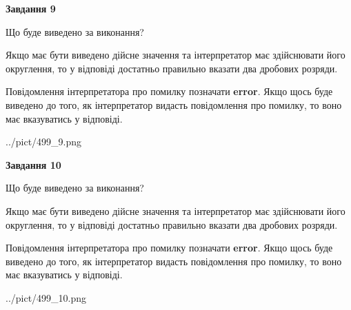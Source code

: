 \documentclass[12pt, ukrainian]{article}
\begin{document}
{\begin {Large}
{\begin {center}\textbf{Завдання 9}\end {center}}\par
Що буде виведено за виконання? \par

Якщо має бути виведено дійсне значення та інтерпретатор має здійснювати його округлення, 
то у відповіді достатньо правильно вказати два дробових розряди.

Повідомлення інтерпретатора про помилку позначати \textbf{error}.
Якщо щось буде виведено до того, як інтерпретатор видасть повідомлення про помилку, 
то воно має вказуватись у відповіді. \par

\begin{center}
	{../pict/499_9.png}
\end{center}
\newpage

{\begin {center}\textbf{Завдання 10}\end {center}}\par
Що буде виведено за виконання? \par

Якщо має бути виведено дійсне значення та інтерпретатор має здійснювати його округлення, 
то у відповіді достатньо правильно вказати два дробових розряди.

Повідомлення інтерпретатора про помилку позначати \textbf{error}.
Якщо щось буде виведено до того, як інтерпретатор видасть повідомлення про помилку, 
то воно має вказуватись у відповіді. \par

\begin{center}
	{../pict/499_10.png}
\end{center}
\newpage

\end {Large}}
\end{document}

